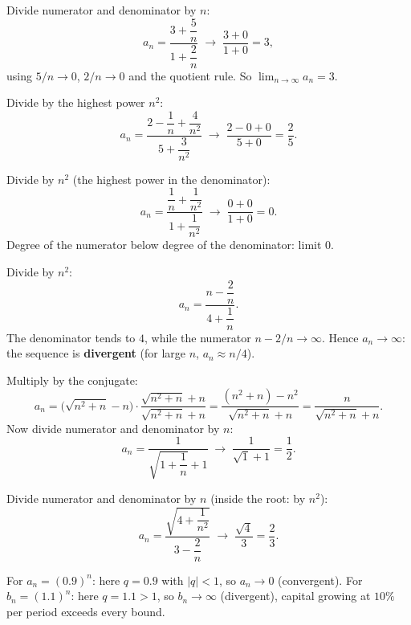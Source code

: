 \begin{solutions}
  \item Divide numerator and denominator by $n$:
        \[
          a_{n}=\frac{3+\dfrac{5}{n}}{1+\dfrac{2}{n}}
          \;\longrightarrow\;\frac{3+0}{1+0}=3 ,
        \]
        using $5/n\to 0$, $2/n\to 0$ and the quotient rule. So
        $\lim_{n\to\infty}a_{n}=3$.

  \item Divide by the highest power $n^{2}$:
        \[
          a_{n}=\frac{2-\dfrac{1}{n}+\dfrac{4}{n^{2}}}{5+\dfrac{3}{n^{2}}}
          \;\longrightarrow\;\frac{2-0+0}{5+0}=\frac{2}{5} .
        \]

  \item Divide by $n^{2}$ (the highest power in the denominator):
        \[
          a_{n}=\frac{\dfrac{1}{n}+\dfrac{1}{n^{2}}}{1+\dfrac{1}{n^{2}}}
          \;\longrightarrow\;\frac{0+0}{1+0}=0 .
        \]
        Degree of the numerator below degree of the denominator: limit $0$.

  \item Divide by $n^{2}$:
        \[
          a_{n}=\frac{n-\dfrac{2}{n}}{4+\dfrac{1}{n}} .
        \]
        The denominator tends to $4$, while the numerator $n-2/n\to\infty$.
        Hence $a_{n}\to\infty$: the sequence is \textbf{divergent}
        (for large $n$, $a_{n}\approx n/4$).

  \item Multiply by the conjugate:
        \[
          a_{n}=\bigl(\sqrt{n^{2}+n}-n\bigr)
                \cdot\frac{\sqrt{n^{2}+n}+n}{\sqrt{n^{2}+n}+n}
               =\frac{(n^{2}+n)-n^{2}}{\sqrt{n^{2}+n}+n}
               =\frac{n}{\sqrt{n^{2}+n}+n} .
        \]
        Now divide numerator and denominator by $n$:
        \[
          a_{n}=\frac{1}{\sqrt{1+\dfrac{1}{n}}+1}
          \;\longrightarrow\;\frac{1}{\sqrt{1}+1}=\frac{1}{2} .
        \]

  \item Divide numerator and denominator by $n$ (inside the root: by
        $n^{2}$):
        \[
          a_{n}=\frac{\sqrt{4+\dfrac{1}{n^{2}}}}{3-\dfrac{2}{n}}
          \;\longrightarrow\;\frac{\sqrt{4}}{3}=\frac{2}{3} .
        \]

  \item For $a_{n}=(0.9)^{n}$: here $q=0.9$ with $|q|<1$, so
        $a_{n}\to 0$ (convergent). For $b_{n}=(1.1)^{n}$: here $q=1.1>1$,
        so $b_{n}\to\infty$ (divergent), capital growing at $10\%$ per
        period exceeds every bound.


\end{solutions}
